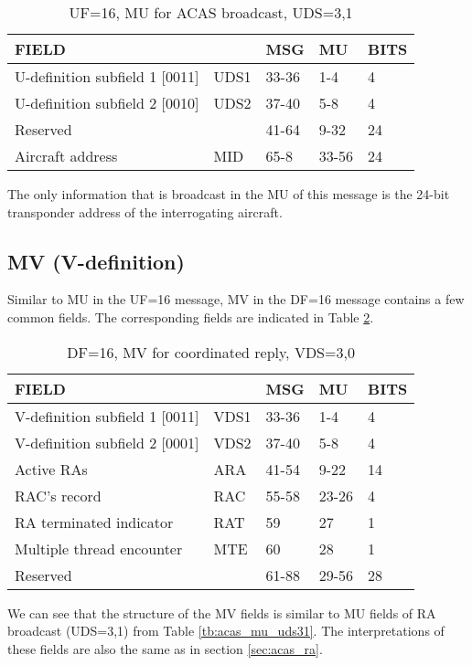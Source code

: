 \begin{table}[ht]
\caption{UF=16, MU for ACAS broadcast, UDS=3,1}
\label{tb:acas_mu_uds32}
\begin{tabular}{|l|l|l|l|l|}
\hline
\textbf{FIELD} & \textbf{} & \textbf{MSG} & \textbf{MU} & \textbf{BITS} \\ \hline
U-definition subfield 1 [0011] & UDS1 & 33-36 & 1-4 & 4 \\ \hline
U-definition subfield 2 [0010] & UDS2 & 37-40 & 5-8 & 4 \\ \hline
Reserved &  & 41-64 & 9-32 & 24 \\ \hline
Aircraft address & MID & 65-8 & 33-56 & 24 \\ \hline
\end{tabular}
\end{table}

The only information that is broadcast in the MU of this message is the 24-bit transponder address of the interrogating aircraft.


\subsection{MV (V-definition)}

Similar to MU in the UF=16 message, MV in the DF=16 message contains a few common fields. The corresponding fields are indicated in Table \ref{tb:acas_mv_vds30}.

\begin{table}[ht]
\caption{DF=16, MV for coordinated reply, VDS=3,0}
\label{tb:acas_mv_vds30}
\begin{tabular}{|l|l|l|l|l|}
\hline
\textbf{FIELD} & \textbf{} & \textbf{MSG} & \textbf{MU} & \textbf{BITS} \\ \hline
V-definition subfield 1 [0011] & VDS1 & 33-36 & 1-4 & 4 \\ \hline
V-definition subfield 2 [0001] & VDS2 & 37-40 & 5-8 & 4 \\ \hline
Active RAs & ARA & 41-54 & 9-22 & 14 \\ \hline
RAC's record & RAC & 55-58 & 23-26 & 4 \\ \hline
RA terminated indicator & RAT & 59 & 27 & 1 \\ \hline
Multiple thread encounter & MTE & 60 & 28 & 1 \\ \hline
Reserved &  & 61-88 & 29-56 & 28 \\ \hline
\end{tabular}
\end{table}

We can see that the structure of the MV fields is similar to MU fields of RA broadcast (UDS=3,1) from Table \ref{tb:acas_mu_uds31}. The interpretations of these fields are also the same as in section \ref{sec:acas_ra}.
